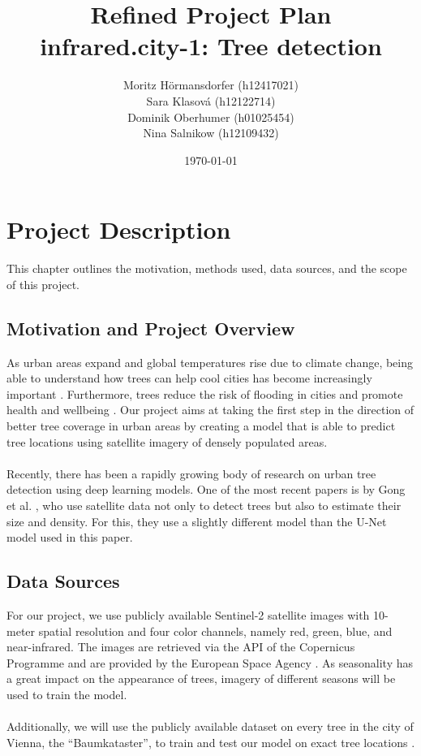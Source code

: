 \documentclass[12pt]{article}
\title{Refined Project Plan\\\large infrared.city-1: Tree detection}
\author{
Moritz Hörmansdorfer (h12417021) \\
Sara Klasová (h12122714) \\
Dominik Oberhumer (h01025454) \\
Nina Salnikow (h12109432) \\
}
\date{\today}
\begin{document}
\maketitle
\thispagestyle{empty} 

\clearpage
{} 

\tableofcontents 
\clearpage      


\section{Project Description}

This chapter outlines the motivation, methods used, data sources, and the scope of this project.

\subsection{Motivation and Project Overview}

As urban areas expand and global temperatures rise due to climate change, being able to understand how trees can help cool cities has become increasingly important \cite{eu2023tree}. Furthermore, trees reduce the risk of flooding in cities and promote health and wellbeing \cite{woodlandtrust2023}. Our project aims at taking the first step in the direction of better tree coverage in urban areas by creating a model that is able to predict tree locations using satellite imagery of densely populated areas. \\
\\
Recently, there has been a rapidly growing body of research on urban tree detection using deep learning models. One of the most recent papers is by Gong et al. \cite{gong2024treedetector}, who use satellite data not only to detect trees but also to estimate their size and density. For this, they use a slightly different model than the U-Net model used in this paper.

\subsection{Data Sources}

For our project, we use publicly available Sentinel-2 satellite images with 10-meter spatial resolution and four color channels, namely red, green, blue, and near-infrared. The images are retrieved via the API of the Copernicus Programme and are provided by the European Space Agency \cite{copernicus2025}. As seasonality has a great impact on the appearance of trees, imagery of different seasons will be used to train the model. \\
\\
Additionally, we will use the publicly available dataset on every tree in the city of Vienna, the ``Baumkataster'', to train and test our model on exact tree locations \cite{baumkataster2025}.
\end{document}
